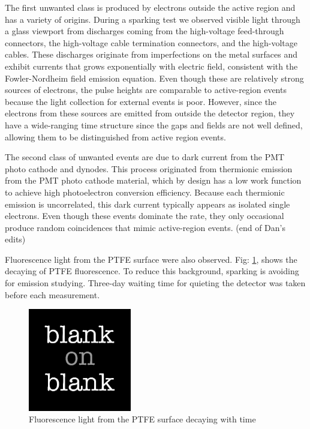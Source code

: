 The first unwanted class is produced by electrons outside the active region and has a variety of origins. During a sparking test we observed visible light through a glass viewport from discharges coming from the high-voltage feed-through connectors, the high-voltage cable termination connectors, and the high-voltage cables. These discharges originate from imperfections on the metal surfaces and exhibit currents that grows exponentially with electric field, consistent with the Fowler-Nordheim field emission equation.  Even though these are relatively strong sources of electrons, the pulse heights are comparable to active-region events because the light collection for external events is poor. However, since the electrons from these sources are emitted from outside the detector region, they have a wide-ranging time structure since the gaps and fields are not well defined, allowing them to be distinguished from active region events.

The second class of unwanted events are due to dark current from the PMT photo cathode and dynodes. This process originated from thermionic emission from the PMT photo cathode material, which by design has a low work function to achieve high photoelectron conversion efficiency. Because each thermionic emission is uncorrelated, this dark current typically appears as isolated single electrons. Even though these events dominate the rate, they only occasional produce random coincidences that mimic active-region events. (end of Dan's edits)

Fluorescence light from the PTFE surface were also observed. Fig: \ref{fig: PTFE fluorescence ignition}, shows the decaying of PTFE fluorescence. To reduce this background, sparking is avoiding for emission studying. Three-day waiting time for quieting the detector was taken before each measurement. 


\begin{figure}[!ht]
  \centering
  \includegraphics[width=0.4\textwidth]
  {blank.jpg}
  \caption{Fluorescence light from the PTFE surface decaying with time}
  \label{fig: PTFE fluorescence ignition}
\end{figure}

